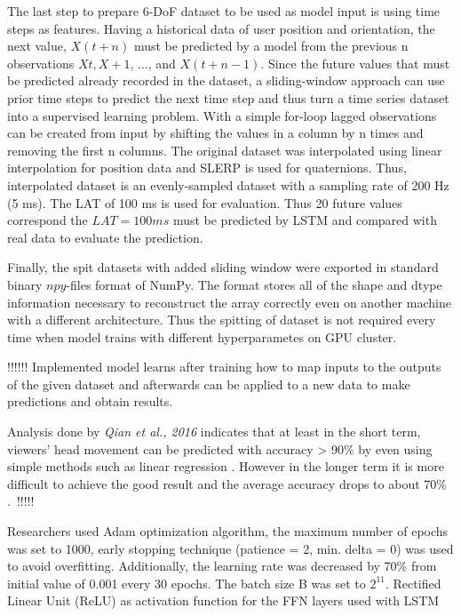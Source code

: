 The last step to prepare 6-DoF dataset to be used as model input is using time steps as features. Having a historical data of user position and orientation, the next value, $X(t+n)$ must be predicted by a model from the previous n observations $Xt, X+1$, ..., and $X(t+n-1)$. Since the future values that must be predicted already recorded in the dataset, a sliding-window approach can use prior time steps to predict the next time step and thus turn a time series dataset into a supervised learning problem. With a simple for-loop lagged observations can be created from input by shifting the values in a column by n times and removing the first n columns. The original dataset was interpolated using linear interpolation for position data and SLERP is used for quaternions. Thus, interpolated dataset is an evenly-sampled dataset with a sampling rate of 200 Hz (5 ms). The LAT of 100 ms is used for evaluation. Thus 20 future values correspond the $LAT = 100 ms$ must be predicted by LSTM and compared with real data to evaluate the prediction. 

Finally, the spit datasets with added sliding window were exported in standard binary $npy$-files format of NumPy. The format stores all of the shape and dtype information necessary to reconstruct the array correctly even on another machine with a different architecture. Thus the spitting of dataset is not required every time when model trains with different hyperparametes on GPU cluster.


!!!!!!
Implemented model learns after training how to map inputs to the outputs of the given dataset and afterwards can be applied to a new data to make predictions and obtain results.

Analysis done by \textit{Qian et al., 2016} indicates that at least in the short term, viewers’ head movement can be predicted with accuracy > 90\% by even using simple methods such as linear regression \cite{cellular_opt}. However in the longer term it is more difficult to achieve the good result and the average accuracy drops to about 70\% \cite{cellular_opt}.\
!!!!!

Researchers used Adam optimization algorithm, the maximum number of epochs was set to 1000, early stopping technique (patience = 2, min. delta = 0) was used to avoid overfitting. Additionally, the learning rate was decreased by 70\% from initial value of 0.001 every 30 epochs. The batch size B was set to $2^{11}$. Rectified Linear Unit (ReLU) as activation function for the FFN layers used with LSTM

